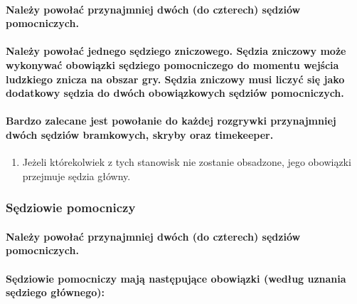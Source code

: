 \documentclass[12pt]{article}
\begin{document}
\paragraph{Należy powołać przynajmniej dwóch (do czterech)
	sędziów pomocniczych.}

\paragraph{Należy powołać jednego sędziego zniczowego. Sędzia
	zniczowy może wykonywać obowiązki sędziego pomocniczego do momentu
	wejścia ludzkiego znicza na obszar gry. Sędzia zniczowy musi liczyć się
	jako dodatkowy sędzia do dwóch obowiązkowych sędziów pomocniczych.}

\paragraph{Bardzo zalecane jest powołanie do każdej rozgrywki
	przynajmniej dwóch sędziów bramkowych, skryby oraz timekeeper.}

\begin{enumerate}
	\item
	      Jeżeli którekolwiek z tych stanowisk nie zostanie obsadzone, jego
	      obowiązki przejmuje sędzia główny.
\end{enumerate}

\subsubsection{Sędziowie pomocniczy}

\paragraph{Należy powołać przynajmniej dwóch (do czterech)
	sędziów pomocniczych.}

\paragraph{Sędziowie pomocniczy mają następujące obowiązki
	(według uznania sędziego głównego):}
\end{document}

